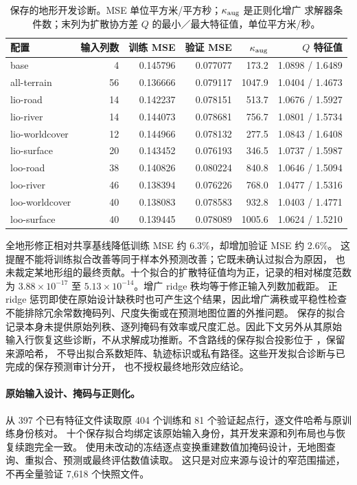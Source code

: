 \begin{table}[htbp]
\centering\footnotesize
\caption{保存的地形开发诊断。MSE 单位平方米/平方秒；\(\kappa_{\rm aug}\) 是正则化增广
求解器条件数；末列为扩散协方差 \(Q\) 的最小／最大特征值，单位平方米/秒。}
\label{tab:terrain-fit-diagnostics}\hypertarget{tab:terrain-fit-diagnostics}{}
\begin{tabular}{lrrrrr}
\toprule
配置 & 输入列数 & 训练 MSE & 验证 MSE & \(\kappa_{\rm aug}\) & \(Q\) 特征值\\
\midrule
base & 4 & 0.145796 & 0.077077 & 173.2 & 1.0898 / 1.6489\\
all-terrain & 56 & 0.136666 & 0.079117 & 1047.9 & 1.0404 / 1.4673\\
lio-road & 14 & 0.142237 & 0.078151 & 513.7 & 1.0676 / 1.5927\\
lio-river & 14 & 0.144073 & 0.078681 & 756.7 & 1.0801 / 1.5734\\
lio-worldcover & 12 & 0.144966 & 0.078132 & 277.5 & 1.0843 / 1.6408\\
lio-surface & 20 & 0.143452 & 0.076193 & 346.5 & 1.0737 / 1.5987\\
loo-road & 38 & 0.140826 & 0.080224 & 840.8 & 1.0646 / 1.5094\\
loo-river & 46 & 0.138394 & 0.076226 & 768.0 & 1.0477 / 1.5316\\
loo-worldcover & 40 & 0.138083 & 0.078583 & 932.8 & 1.0403 / 1.4771\\
loo-surface & 40 & 0.139445 & 0.078089 & 1005.6 & 1.0624 / 1.5210\\
\bottomrule
\end{tabular}
\end{table}

全地形修正相对共享基线降低训练 MSE 约 6.3\%，却增加验证 MSE 约 2.6\%。
这提醒不能将训练拟合改善等同于样本外预测改善；它既未确认过拟合为原因，
也未裁定某地形组的最终贡献。十个拟合的扩散特征值均为正，记录的相对梯度范数为
\(3.88\times10^{-17}\) 至 \(5.13\times10^{-14}\)。增广 ridge 秩均等于修正输入列数加截距。
正 ridge 惩罚即使在原始设计缺秩时也可产生这个结果，因此增广满秩或平稳性检查
不能排除冗余常数掩码列、尺度失衡或在预测地图位置的外推问题。
保存的拟合记录本身未提供原始列秩、逐列掩码有效率或尺度汇总。因此下文另外从其原始
输入行恢复这些诊断，不从求解成功推断。不含路线的保存拟合投影位于
，保留来源哈希，
不导出拟合系数矩阵、轨迹标识或私有路径。这些开发拟合诊断与已完成的保存预测审计分开，
也不授权最终地形效应结论。

\paragraph{原始输入设计、掩码与正则化。}
从 397 个已有特征文件读取原 404 个训练和 81 个验证起点行，逐文件哈希与原训练身份核对。
十个保存拟合均绑定该原始输入身份，其开发来源和列布局也与恢复续跑完全一致。
使用未改动的冻结逐点变换重建数值加掩码设计，无地图查询、重拟合、预测或最终评估数值读取。
这只是对应来源与设计的窄范围描述，不再全量验证 7,618 个快照文件。

